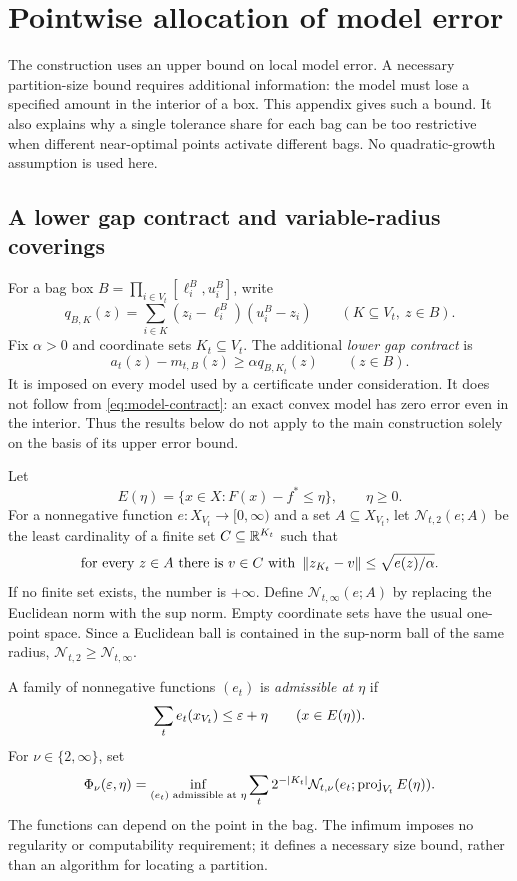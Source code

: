 \section{Pointwise allocation of model error}\label{sec:allocation}

The construction uses an upper bound on local model error. A necessary
partition-size bound requires additional information: the model must lose
a specified amount in the interior of a box. This appendix gives such a
bound. It also explains why a single tolerance share for each bag can be
too restrictive when different near-optimal points activate different
bags. No quadratic-growth assumption is used here.

\subsection{A lower gap contract and variable-radius coverings}
For a bag box $B=\prod_{i\in V_t}[\ell_i^B,u_i^B]$, write
\[
 q_{B,K}(z)=\sum_{i\in K}(z_i-\ell_i^B)(u_i^B-z_i)
 \qquad(K\subseteq V_t,\ z\in B).
\]
Fix $\alpha>0$ and coordinate sets $K_t\subseteq V_t$. The additional
\emph{lower gap contract} is
\begin{equation}\label{eq:allocation-gap}
 a_t(z)-m_{t,B}(z)\ge\alpha q_{B,K_t}(z)
 \qquad(z\in B).
\end{equation}
It is imposed on every model used by a certificate under consideration.
It does not follow from \eqref{eq:model-contract}: an exact convex model
has zero error even in the interior. Thus the results below do not apply
to the main construction solely on the basis of its upper error bound.

Let
\[
 E(\eta)=\{x\in X:F(x)-f^*\le\eta\},\qquad \eta\ge0.
\]
For a nonnegative function $e:X_{V_t}\to[0,\infty)$ and a set
$A\subseteq X_{V_t}$, let $\mathcal N_{t,2}(e;A)$ be the least cardinality
of a finite set $C\subseteq\mathbb R^{K_t}$ such that
\[
 \text{for every }z\in A\text{ there is }v\in C\text{ with }
 \left\lVert z_{K_t}-v\right\rVert\le\sqrt{e(z)/\alpha}.
\]
If no finite set exists, the number is $+\infty$.
Define $\mathcal N_{t,\infty}(e;A)$ by replacing the Euclidean norm with
the sup norm. Empty coordinate sets have the usual one-point space.
Since a Euclidean ball is contained in the sup-norm ball of the same
radius, $\mathcal N_{t,2}\ge\mathcal N_{t,\infty}$.

A family of nonnegative functions $(e_t)$ is \emph{admissible at
$\eta$} if
\begin{equation}\label{eq:allocation-admissible}
 \sum_t e_t(x_{V_t})\le\varepsilon+\eta\qquad(x\in E(\eta)).
\end{equation}
For $\nu\in\{2,\infty\}$, set
\begin{equation}\label{eq:allocation-phi}
 \Phi_\nu(\varepsilon,\eta)=
 \inf_{(e_t)\text{ admissible at }\eta}
 \sum_t2^{-|K_t|}\mathcal N_{t,\nu}
       (e_t;\operatorname{proj}_{V_t}E(\eta)).
\end{equation}
The functions can depend on the point in the bag. The infimum imposes no
regularity or computability requirement; it defines a necessary size
bound, rather than an algorithm for locating a partition.

